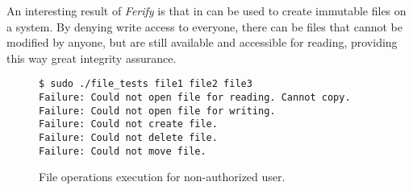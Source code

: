 \par An interesting result of \emph{Ferify} is that in can be used to create immutable files on a system. By denying write access to everyone, there can be files that cannot be modified by anyone, but are still available and accessible for reading, providing this way great integrity assurance.

\begin{figure}[ht]
	\centering
	\footnotesize{\selectfont 
		\begin{lstlisting}
$ sudo ./file_tests file1 file2 file3
Failure: Could not open file for reading. Cannot copy.
Failure: Could not open file for writing.
Failure: Could not create file.
Failure: Could not delete file.
Failure: Could not move file.
		\end{lstlisting}}
	\caption{File operations execution for non-authorized user.}
	\label{fig:results2}
\end{figure}




